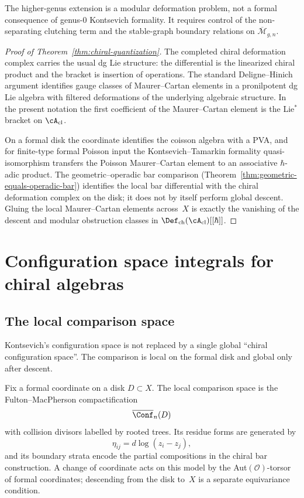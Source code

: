 \begin{remark}\label{rem:chiral-quantization-higher-genus}
The higher-genus extension is a modular deformation problem, not a
formal consequence of genus-$0$ Kontsevich formality. It requires
control of the non-separating clutching term and the stable-graph
boundary relations on $\overline{\mathcal{M}}_{g,n}$.
\end{remark}

\begin{proof}[Proof of Theorem~\ref{thm:chiral-quantization}]
The completed chiral deformation complex carries the usual dg Lie
structure: the differential is the linearized chiral product and the
bracket is insertion of operations. The standard Deligne--Hinich
argument identifies gauge classes of Maurer--Cartan elements in a
pronilpotent dg Lie algebra with filtered deformations of the
underlying algebraic structure. In the present notation the first
coefficient of the Maurer--Cartan element is the Lie$^*$ bracket on
$\cA_{\mathrm{cl}}$.

On a formal disk the coordinate identifies the coisson algebra with a
PVA, and for finite-type formal Poisson input the
Kontsevich--Tamarkin formality quasi-isomorphism transfers the Poisson
Maurer--Cartan element to an associative $\hbar$-adic product. The
geometric--operadic bar comparison
(Theorem~\ref{thm:geometric-equals-operadic-bar}) identifies the local
bar differential with the chiral deformation complex on the disk; it
does not by itself perform global descent. Gluing the local
Maurer--Cartan elements across~$X$ is exactly the vanishing of the
descent and modular obstruction classes in
\(\Def_{\mathrm{ch}}(\cA_{\mathrm{cl}})[[\hbar]]\).
\end{proof}

\section{Configuration space integrals for chiral algebras}

\subsection{The local comparison space}

Kontsevich's configuration space is not replaced by a single global
``chiral configuration space''. The comparison is local on the formal
disk and global only after descent.

\begin{definition}
Fix a formal coordinate on a disk $D\subset X$. The local comparison
space is the Fulton--MacPherson compactification
\[
\overline{\Conf}_n(D)
\]
with collision divisors labelled by rooted trees. Its residue forms are
generated by
\[
\eta_{ij}=d\log(z_i-z_j),
\]
and its boundary strata encode the partial compositions in the chiral
bar construction. A change of coordinate acts on this model by the
Aut$(\mathcal O)$-torsor of formal coordinates; descending from the
disk to~$X$ is a separate equivariance condition.
\end{definition}

